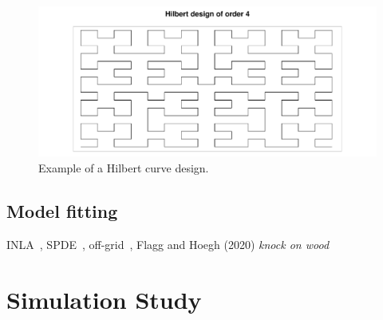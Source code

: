 \documentclass[review]{elsarticle}
\begin{document}
\begin{figure}
\includegraphics[width=5in]{Hilbert000180.pdf}
\caption{Example of a Hilbert curve design.}
\label{hilbert000180}
\end{figure}





\subsection{Model fitting}

INLA~\citep{rueetal}, SPDE~\citep{lindgrenetal}, off-grid~\citep{simpsonetal},
Flagg and Hoegh (2020) \emph{knock on wood}


\section{Simulation Study}
\end{document}
